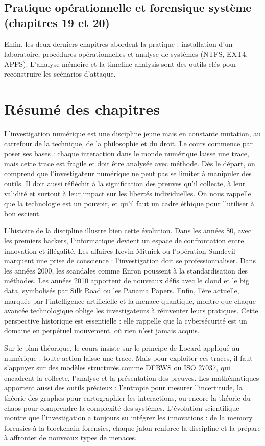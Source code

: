 \documentclass[12pt,a4paper]{report}
\begin{document}
	\section*{Pratique opérationnelle et forensique système (chapitres 19 et 20)}
	Enfin, les deux derniers chapitres abordent la pratique : 
	installation d’un laboratoire, procédures opérationnelles et analyse de systèmes (NTFS, EXT4, APFS). 
	L’analyse mémoire et la timeline analysis sont des outils clés 
	pour reconstruire les scénarios d’attaque.  
	
	\chapter*{Résumé des chapitres}
	
	L’investigation numérique est une discipline jeune mais en constante mutation, au carrefour de la technique, de la philosophie et du droit. Le cours commence par poser ses bases : chaque interaction dans le monde numérique laisse une trace, mais cette trace est fragile et doit être analysée avec méthode. Dès le départ, on comprend que l’investigateur numérique ne peut pas se limiter à manipuler des outils. Il doit aussi réfléchir à la signification des preuves qu’il collecte, à leur validité et surtout à leur impact sur les libertés individuelles. On nous rappelle que la technologie est un pouvoir, et qu’il faut un cadre éthique pour l’utiliser à bon escient.
	

	L’histoire de la discipline illustre bien cette évolution. Dans les années 80, avec les premiers hackers, l’informatique devient un espace de confrontation entre innovation et illégalité. Les affaires Kevin Mitnick ou l’opération Sundevil marquent une prise de conscience : l’investigation doit se professionnaliser. Dans les années 2000, les scandales comme Enron poussent à la standardisation des méthodes. Les années 2010 apportent de nouveaux défis avec le cloud et le big data, symbolisés par Silk Road ou les Panama Papers. Enfin, l’ère actuelle, marquée par l’intelligence artificielle et la menace quantique, montre que chaque avancée technologique oblige les investigateurs à réinventer leurs pratiques. Cette perspective historique est essentielle : elle rappelle que la cybersécurité est un domaine en perpétuel mouvement, où rien n’est jamais acquis.
	
	
	Sur le plan théorique, le cours insiste sur le principe de Locard appliqué au numérique : toute action laisse une trace. Mais pour exploiter ces traces, il faut s’appuyer sur des modèles structurés comme DFRWS ou ISO 27037, qui encadrent la collecte, l’analyse et la présentation des preuves. Les mathématiques apportent aussi des outils précieux : l’entropie pour mesurer l’incertitude, la théorie des graphes pour cartographier les interactions, ou encore la théorie du chaos pour comprendre la complexité des systèmes. L’évolution scientifique montre que l’investigation a toujours su intégrer les innovations : de la memory forensics à la blockchain forensics, chaque jalon renforce la discipline et la prépare à affronter de nouveaux types de menaces.
	
\end{document}
